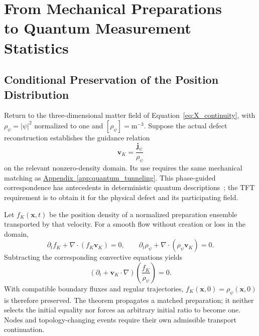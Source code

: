 \section[From Mechanical Preparations to Quantum Measurement Statistics]
{From Mechanical Preparations\\to Quantum Measurement Statistics}
\label{sec:DMR_quantum_correspondence}

\subsection{Conditional Preservation of the Position Distribution}

Return to the three-dimensional matter field of Equation~\eqref{eq:X_continuity}, with $\rho_\psi=|\psi|^2$ normalized to one and $[\rho_\psi]=\mathrm{m^{-3}}$. Suppose the actual defect reconstruction establishes the guidance relation
\begin{equation}
 \mathbf v_K=\frac{\mathbf j_\psi}{\rho_\psi}
\label{eq:DMR_guidance_condition}
\end{equation}
on the relevant nonzero-density domain. Its use requires the same mechanical matching as \hyperref[app:quantum_tunneling]{Appendix~\ref*{app:quantum_tunneling}}. This phase-guided correspondence has antecedents in deterministic quantum descriptions~\cite{Bohm_1952,DMR_DurrGoldsteinZanghi1992}; the TFT requirement is to obtain it for the physical defect and its participating field.

Let $f_K(\mathbf x,t)$ be the position density of a normalized preparation ensemble transported by that velocity. For a smooth flow without creation or loss in the domain,
\begin{equation}
 \partial_t f_K+\nabla\cdot(f_K\mathbf v_K)=0,
 \qquad
 \partial_t\rho_\psi+\nabla\cdot(\rho_\psi\mathbf v_K)=0.
\end{equation}
Subtracting the corresponding convective equations yields
\begin{equation}
 \boxed{
 (\partial_t+\mathbf v_K\cdot\nabla)
 \left(\frac{f_K}{\rho_\psi}\right)=0
 }.
\label{eq:DMR_equivariance}
\end{equation}
With compatible boundary fluxes and regular trajectories, $f_K(\mathbf x,0)=\rho_\psi(\mathbf x,0)$ is therefore preserved. The theorem propagates a matched preparation; it neither selects the initial equality nor forces an arbitrary initial ratio to become one. Nodes and topology-changing events require their own admissible transport continuation.

